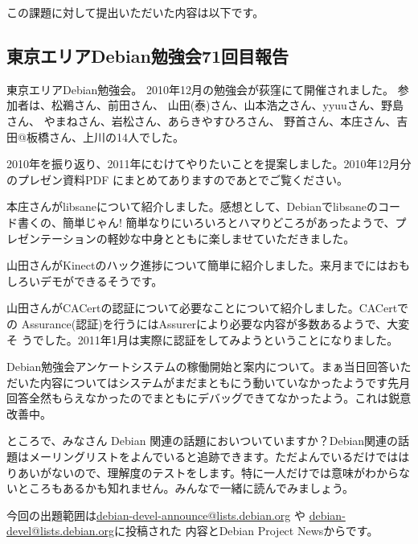\documentclass[mingoth,a4paper]{jsarticle}
\begin{document}
この課題に対して提出いただいた内容は以下です。
\begin{multicols}{2}
{\small
 
}
\end{multicols}

\subsection{東京エリアDebian勉強会71回目報告}


東京エリアDebian勉強会。
2010年12月の勉強会が荻窪にて開催されました。
参加者は、松鵜さん、前田さん、
山田(泰)さん、山本浩之さん、yyuuさん、野島さん、
やまねさん、岩松さん、あらきやすひろさん、
野首さん、本庄さん、吉田@板橋さん、上川の14人でした。

2010年を振り返り、2011年にむけてやりたいことを提案しました。2010年12月分
のプレゼン資料PDF にまとめてありますのであとでご覧ください。

本庄さんがlibsaneについて紹介しました。感想として、Debianでlibsaneのコー
ド書くの、簡単じゃん!  簡単なりにいろいろとハマりどころがあったようで、プ
レゼンテーションの軽妙な中身とともに楽しませていただきました。

山田さんがKinectのハック進捗について簡単に紹介しました。来月までにはおもしろいデモができるそうです。

山田さんがCACertの認証について必要なことについて紹介しました。CACertでの
Assurance(認証)を行うにはAssurerにより必要な内容が多数あるようで、大変そ
うでした。2011年1月は実際に認証をしてみようということになりました。

Debian勉強会アンケートシステムの稼働開始と案内について。まぁ当日回答いた
だいた内容についてはシステムがまだまともにう動いていなかったようです先月
回答全然もらえなかったのでまともにデバッグできてなかったよう。これは鋭意
改善中。



ところで、みなさん Debian 関連の話題においついていますか？Debian関連の話
題はメーリングリストをよんでいると追跡できます。ただよんでいるだけではは
りあいがないので、理解度のテストをします。特に一人だけでは意味がわからな
いところもあるかも知れません。みんなで一緒に読んでみましょう。

今回の出題範囲は\url{debian-devel-announce@lists.debian.org} や \url{debian-devel@lists.debian.org}に投稿された
内容とDebian Project Newsからです。
\end{document}
